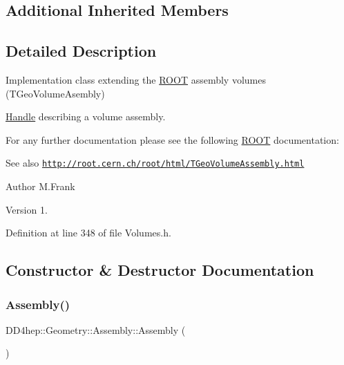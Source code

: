 \subsection*{Additional Inherited Members}


\subsection{Detailed Description}
Implementation class extending the \hyperlink{namespace_r_o_o_t}{R\+O\+OT} assembly volumes (T\+Geo\+Volume\+Asembly) 

\hyperlink{class_d_d4hep_1_1_handle}{Handle} describing a volume assembly.

For any further documentation please see the following \hyperlink{namespace_r_o_o_t}{R\+O\+OT} documentation\+: \begin{DoxySeeAlso}{See also}
\href{http://root.cern.ch/root/html/TGeoVolumeAssembly.html}{\tt http\+://root.\+cern.\+ch/root/html/\+T\+Geo\+Volume\+Assembly.\+html}
\end{DoxySeeAlso}
\begin{DoxyAuthor}{Author}
M.\+Frank 
\end{DoxyAuthor}
\begin{DoxyVersion}{Version}
1. 
\end{DoxyVersion}


Definition at line 348 of file Volumes.\+h.



\subsection{Constructor \& Destructor Documentation}
\hypertarget{class_d_d4hep_1_1_geometry_1_1_assembly_a18347f291bd562b3ef99fe05f043b03c}{}\label{class_d_d4hep_1_1_geometry_1_1_assembly_a18347f291bd562b3ef99fe05f043b03c} 
\subsubsection{\texorpdfstring{Assembly()}{Assembly()}\hspace{0.1cm}{\footnotesize\ttfamily [1/4]}}
{\footnotesize\ttfamily D\+D4hep\+::\+Geometry\+::\+Assembly\+::\+Assembly (\begin{DoxyParamCaption}{ }\end{DoxyParamCaption})\hspace{0.3cm}{\ttfamily [inline]}}



